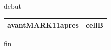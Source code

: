 \documentclass[11pt,a4paper]{article}
\begin{document}
debut

\begin{table}[h]
\begin{tabular}{|l|l|}
\hline
avantMARK11apres & cellB \\ \hline
\end{tabular}
\end{table}

fin
\end{document}
